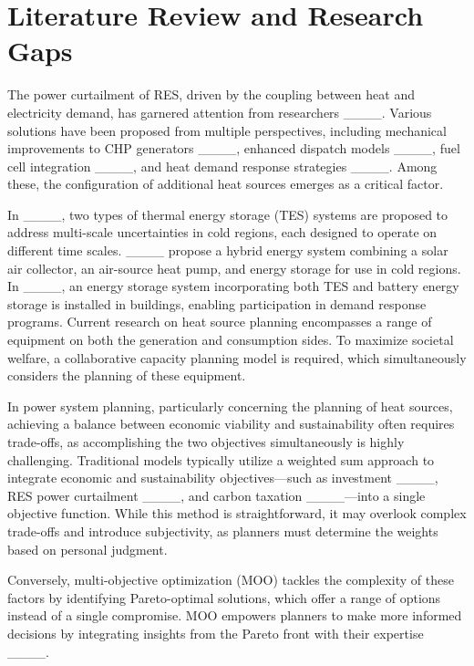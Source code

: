 \section{Literature Review and Research Gaps}
The power curtailment of RES, driven by the coupling between heat and electricity demand, has garnered attention from researchers ____. Various solutions have been proposed from multiple perspectives, including mechanical improvements to CHP generators ____, enhanced dispatch models ____, fuel cell integration ____, and heat demand response strategies ____. Among these, the configuration of additional heat sources emerges as a critical factor.

In ____, two types of thermal energy storage (TES) systems are proposed to address multi-scale uncertainties in cold regions, each designed to operate on different time scales.
____ propose a hybrid energy system combining a solar air collector, an air-source heat pump, and energy storage for use in cold regions. In ____, an energy storage system incorporating both TES and battery energy storage is installed in buildings, enabling participation in demand response programs.
Current research on heat source planning encompasses a range of equipment on both the generation and consumption sides. To maximize societal welfare, a collaborative capacity planning model is required, which simultaneously considers the planning of these equipment.

In power system planning, particularly concerning the planning of heat sources, achieving a balance between economic viability and sustainability often requires trade-offs, as accomplishing the two objectives simultaneously is highly challenging. Traditional models typically utilize a weighted sum approach to integrate economic and sustainability objectives—such as investment ____, RES power curtailment ____, and carbon taxation ____—into a single objective function. While this method is straightforward, it may overlook complex trade-offs and introduce subjectivity, as planners must determine the weights based on personal judgment.

Conversely, multi-objective optimization (MOO) tackles the complexity of these factors by identifying Pareto-optimal solutions, which offer a range of options instead of a single compromise. MOO empowers planners to make more informed decisions by integrating insights from the Pareto front with their expertise ____.

